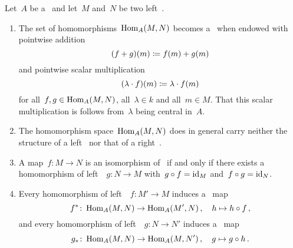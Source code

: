 \begin{remark}
  Let~$A$ be a~{\kalg} and let~$M$ and~$N$ be two left~{}.
  \begin{enumerate}
    \item
      The set of homomorphisms~$\operatorname{Hom}_A(M,N)$ becomes a~{\module{$\kf$}} when endowed with pointwise addition
      \[
                  (f + g)(m)
        \coloneqq  f(m) + g(m)
      \]
      and pointwise scalar multiplication
      \[
                  (\lambda \cdot f)(m)
        \coloneqq  \lambda \cdot f(m)
      \]
      for all~$f, g \in \operatorname{Hom}_A(M,N)$, all~$\lambda \in k$ and all~$m \in M$.
      That this scalar multiplication is {\welldef} follows from~$\lambda$ being central in~$A$.
    \item
      The homomorphism space~$\operatorname{Hom}_A(M,N)$ does in general carry neither the structure of a left~{} nor that of a right~{}.
    \item
      A map~$f \colon M \to N$ is an isomorphism of~{} if and only if there exists a homomorphism of left~{}~$g \colon N \to M$ with~$g \circ f = \operatorname{id}_M$ and~$f \circ g = \operatorname{id}_N$.
    \item
      Every homomorphism of left~{}~$f \colon M' \to M$ induces a~{\klin} map
      \[
                f^*
        \colon  \operatorname{Hom}_A(M, N)
        \to     \operatorname{Hom}_A(M', N) \,,
        \quad   h
        \mapsto h \circ f \,,
      \]
      and every homomorphism of left~{}~$g \colon N \to N'$ induces a~{\klin} map
      \[
                g_*
        \colon  \operatorname{Hom}_A(M, N)
        \to     \operatorname{Hom}_A(M, N') \,,
        \quad   g
        \mapsto g \circ h \,.
      \]
  \end{enumerate}
\end{remark}


